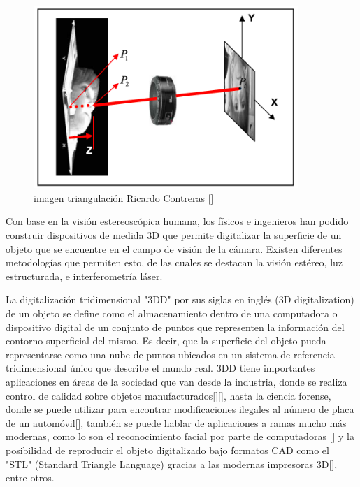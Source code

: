 \documentclass[UTF8]{article}
\begin{document}
\begin{figure}[h!]
\includegraphics[width=10cm]{perdida3d.png}
\centering
\caption{imagen triangulación Ricardo Contreras []}
\label{im3}
\end{figure}
\medskip

Con base en la visión estereoscópica humana, los físicos e ingenieros han podido construir dispositivos de medida 3D que permite digitalizar la superficie de un objeto que se encuentre en el campo de visión de la cámara. Existen diferentes metodologías que permiten esto, de las cuales se destacan la visión estéreo, luz estructurada, e interferometría láser.
\medskip

La digitalización tridimensional "3DD" por sus siglas en inglés (3D digitalization) de un objeto se define como el almacenamiento dentro de una computadora o dispositivo digital de un conjunto de puntos que representen la información del contorno superficial del mismo. Es decir, que la superficie del objeto pueda representarse como una nube de puntos ubicados en un sistema de referencia tridimensional único que describe el mundo real.
%
3DD tiene importantes aplicaciones en áreas de la sociedad que van desde la industria, donde se realiza control de calidad sobre objetos manufacturados[][], hasta la ciencia forense, donde se puede utilizar para encontrar modificaciones ilegales al número de placa de un automóvil[], también se puede hablar de aplicaciones a ramas mucho más modernas, como lo son el reconocimiento facial por parte de computadoras [] y la posibilidad de reproducir el objeto digitalizado bajo formatos CAD como el "STL" (Standard Triangle Language) gracias a las modernas impresoras 3D[], entre otros.
\medskip

\end{document}
